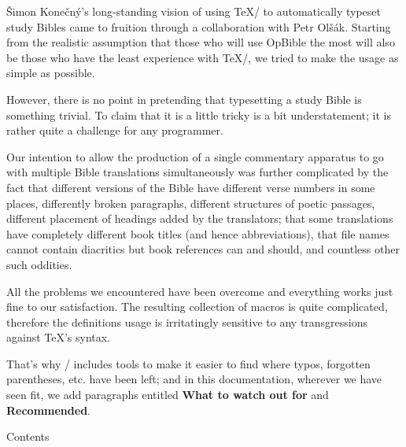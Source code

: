 {Šimon Konečný's long-standing vision of using \TeX/ to automatically typeset study Bibles came to fruition through a collaboration with Petr Olšák.  Starting from the realistic assumption that
those who will use OpBible the most will also be those who have the least experience with \TeX/, we tried to make the usage as simple as possible.

However, there is no point in pretending that typesetting a study Bible is something trivial.  
To claim that it is a little tricky is a bit understatement;
it is rather quite a challenge for any programmer.

Our intention to allow the production of a single commentary apparatus to go with multiple Bible translations simultaneously was
further complicated by the fact that different versions of the Bible have different verse numbers in some places, differently broken paragraphs, 
different structures of poetic passages, different placement of headings added by the translators; that  some translations have completely different book titles (and hence abbreviations),
that file names cannot contain diacritics but book references can and should, and countless other such oddities.

All the problems we encountered have been overcome and everything works just fine to our satisfaction.  The resulting collection of macros is quite complicated,
therefore  the definitions usage is irritatingly sensitive to any transgressions against \TeX's syntax.

That's why \OpBible/ includes tools to make it easier to find where typos, forgotten parentheses, etc. have been left; and in this documentation,
wherever we have seen fit, we add paragraphs entitled {\bf What to watch out for} and {\bf Recommended}.




\vfill 

\eject








%




\notoc\nonum\sec Contents
\maketoc
\vfil\break

} %

